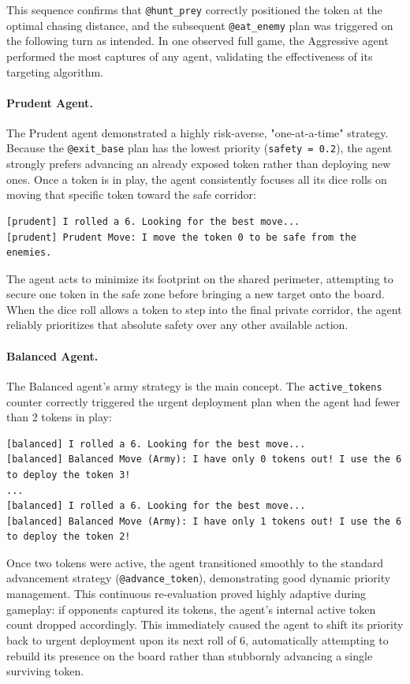 \documentclass[12pt]{article}
\begin{document}
\noindent This sequence confirms that \texttt{@hunt\_prey} correctly positioned
the token at the optimal chasing distance, and the subsequent \texttt{@eat\_enemy}
plan was triggered on the following turn as intended. In one observed full game,
the Aggressive agent performed the most captures of any agent, validating the
effectiveness of its targeting algorithm.

\paragraph{Prudent Agent.}
\noindent The Prudent agent demonstrated a highly risk-averse, "one-at-a-time" strategy. Because the \texttt{@exit\_base} plan has the lowest priority (\texttt{safety = 0.2}), the agent strongly prefers advancing an already exposed token rather than deploying new ones. Once a token is in play, the agent consistently focuses all its dice rolls on moving that specific token toward the safe corridor:
\begin{lstlisting}
[prudent] I rolled a 6. Looking for the best move...
[prudent] Prudent Move: I move the token 0 to be safe from the enemies.
\end{lstlisting}

\noindent The agent acts to minimize its footprint on the shared perimeter, attempting to secure one token in the safe zone before bringing a new target onto the board. When the dice roll allows a token to step into the final private corridor, the agent reliably prioritizes that absolute safety over any other available action.

\paragraph{Balanced Agent.}
\noindent The Balanced agent's army strategy is the main concept. The
\texttt{active\_tokens} counter correctly triggered the urgent deployment plan
when the agent had fewer than 2 tokens in play:

\begin{lstlisting}
[balanced] I rolled a 6. Looking for the best move...
[balanced] Balanced Move (Army): I have only 0 tokens out! I use the 6 to deploy the token 3!
...
[balanced] I rolled a 6. Looking for the best move...
[balanced] Balanced Move (Army): I have only 1 tokens out! I use the 6 to deploy the token 2!
\end{lstlisting}

\noindent Once two tokens were active, the agent transitioned smoothly to the standard advancement strategy (\texttt{@advance\_token}),
 demonstrating good dynamic priority management.
 This continuous re-evaluation proved highly adaptive during gameplay: if opponents captured its tokens,
 the agent's internal active token count dropped accordingly.
 This immediately caused the agent to shift its priority back to urgent deployment upon its next roll of 6,
 automatically attempting to rebuild its presence on the board rather than stubbornly advancing a single surviving token.
\end{document}
